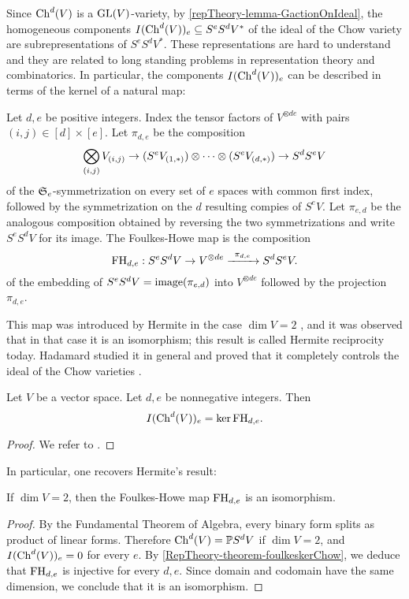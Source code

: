 Since $\mathrm{Ch}^d(V)$ is a $\mathrm{GL}(V)$-variety, by \ref{repTheory-lemma-GactionOnIdeal}, the homogeneous components $I(\mathrm{Ch}^d(V))_e \subseteq S^e S^d V^*$ of the ideal of the Chow variety are subrepresentations of $ S^e S^d V^*$. These representations are hard to understand and they are related to long standing problems in representation theory and combinatorics. In particular, the components $I(\mathrm{Ch}^d(V))_e$ can be described in terms of the kernel of a natural map:
\begin{definition}
 \label{RepTheory-definition-foulkesmap}
 Let $d,e$ be positive integers. Index the tensor factors of $V^{\otimes de}$ with pairs $(i,j) \in [d]\times [e]$. Let $\pi_{d,e}$ be the composition
 \[
\bigotimes_{(i,j)} V_{(i,j)} \to (S^e V_{(1,\ast)}) \otimes \cdots \otimes (S^eV_{(d,\ast)}) \to S^d S^e V  
 \]
 of the $\mathfrak{S}_e$-symmetrization on every set of $e$ spaces with common first index, followed by the symmetrization on the $d$ resulting compies of $S^e V$. Let $\pi_{e,d}$ be the analogous composition obtained by reversing the two symmetrizations and write $S^eS^d V$ for its image. The Foulkes-Howe map is the composition
 \[
 \rmFH_{d,e} : S^e S^d V \to V^{\otimes de} \xto{\pi_{d,e}} S^d S^e V.
 \]
 of the embedding of $S^e S^d V = \mathrm{image}(\pi_{e,d})$ into $V^{\otimes de}$ followed by the projection $\pi_{d,e}$.
 \end{definition}
This map was introduced by Hermite in the case $\dim V = 2$ \cite{Her56}, and it was observed that in that case it is an isomorphism; this result is called Hermite reciprocity today. Hadamard studied it in general and proved that it completely controls the ideal of the Chow varieties \cite{Had97}.
\begin{theorem}
 \label{RepTheory-theorem-foulkeskerChow}
Let $V$ be a vector space. Let $d,e$ be nonnegative integers. Then 
\[
I(\mathrm{Ch}^d (V)) _ e = \ker \mathrm{FH}_{d,e}.
\]
\end{theorem}
\begin{proof}
 We refer to \cite[Prop. 8.6.1.2]{Lan12}.
\end{proof}


In particular, one recovers Hermite's result:
\begin{corollary}
\label{RepTheory-corollary-hermiteReciprocity}
If $\dim V = 2$, then the Foulkes-Howe map $\mathrm{FH}_{d,e}$ is an isomorphism.
\end{corollary}
\begin{proof}
By the Fundamental Theorem of Algebra, every binary form splits as product of linear forms. Therefore $\mathrm{Ch}^d (V) = \mathbb{P} S^d V$ if $\dim V = 2$, and $I(\mathrm{Ch}^d(V))_e = 0$ for every $e$. By \ref{RepTheory-theorem-foulkeskerChow}, we deduce that $\mathrm{FH}_{d,e}$ is injective for every $d,e$. Since domain and codomain have the same dimension, we conclude that it is an isomorphism.
\end{proof}

